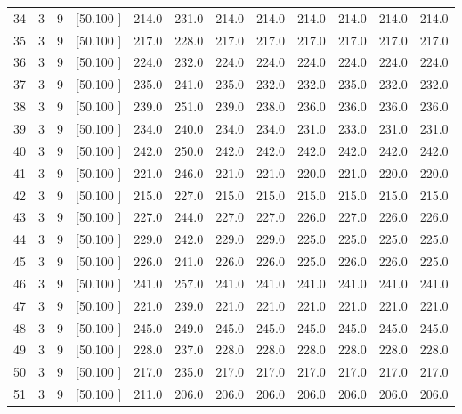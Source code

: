 \documentclass[12pt,a4paper]{article}
\begin{document}
\begin{center}
{\begin{tabular}{r r r r r r r r r r r r}
  34&  3&  9&[50.100    ]&   214.0&   231.0&   214.0&   214.0&   214.0&   214.0&   214.0&   214.0\\[-0.02in]
  35&  3&  9&[50.100    ]&   217.0&   228.0&   217.0&   217.0&   217.0&   217.0&   217.0&   217.0\\[-0.02in]
  36&  3&  9&[50.100    ]&   224.0&   232.0&   224.0&   224.0&   224.0&   224.0&   224.0&   224.0\\[-0.02in]
  37&  3&  9&[50.100    ]&   235.0&   241.0&   235.0&   232.0&   232.0&   235.0&   232.0&   232.0\\[-0.02in]
  38&  3&  9&[50.100    ]&   239.0&   251.0&   239.0&   238.0&   236.0&   236.0&   236.0&   236.0\\[-0.02in]
  39&  3&  9&[50.100    ]&   234.0&   240.0&   234.0&   234.0&   231.0&   233.0&   231.0&   231.0\\[-0.02in]
  40&  3&  9&[50.100    ]&   242.0&   250.0&   242.0&   242.0&   242.0&   242.0&   242.0&   242.0\\[-0.02in]
  41&  3&  9&[50.100    ]&   221.0&   246.0&   221.0&   221.0&   220.0&   221.0&   220.0&   220.0\\[-0.02in]
  42&  3&  9&[50.100    ]&   215.0&   227.0&   215.0&   215.0&   215.0&   215.0&   215.0&   215.0\\[-0.02in]
  43&  3&  9&[50.100    ]&   227.0&   244.0&   227.0&   227.0&   226.0&   227.0&   226.0&   226.0\\[-0.02in]
  44&  3&  9&[50.100    ]&   229.0&   242.0&   229.0&   229.0&   225.0&   225.0&   225.0&   225.0\\[-0.02in]
  45&  3&  9&[50.100    ]&   226.0&   241.0&   226.0&   226.0&   225.0&   226.0&   226.0&   225.0\\[-0.02in]
  46&  3&  9&[50.100    ]&   241.0&   257.0&   241.0&   241.0&   241.0&   241.0&   241.0&   241.0\\[-0.02in]
  47&  3&  9&[50.100    ]&   221.0&   239.0&   221.0&   221.0&   221.0&   221.0&   221.0&   221.0\\[-0.02in]
  48&  3&  9&[50.100    ]&   245.0&   249.0&   245.0&   245.0&   245.0&   245.0&   245.0&   245.0\\[-0.02in]
  49&  3&  9&[50.100    ]&   228.0&   237.0&   228.0&   228.0&   228.0&   228.0&   228.0&   228.0\\[-0.02in]
  50&  3&  9&[50.100    ]&   217.0&   235.0&   217.0&   217.0&   217.0&   217.0&   217.0&   217.0\\[-0.02in]
  51&  3&  9&[50.100    ]&   211.0&   206.0&   206.0&   206.0&   206.0&   206.0&   206.0&   206.0\\[-0.02in]

\end{tabular}}
\end{center}
\end{document}

